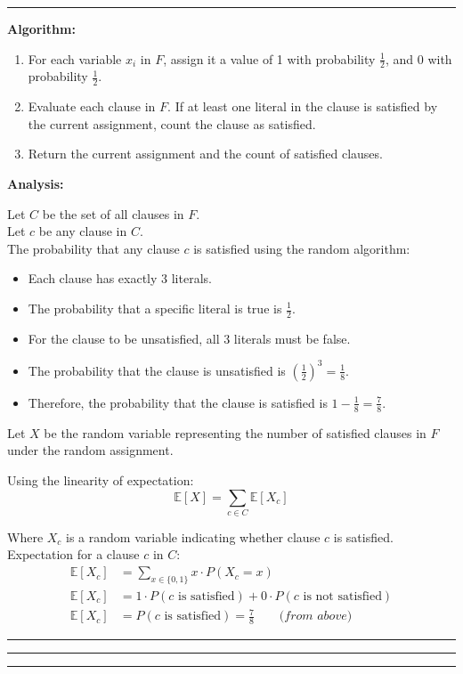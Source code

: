 \documentclass[11pt, english]{article}
\newenvironment{answer}{%
  \par\noindent\hrule %
  \vspace{0.25\baselineskip}%
  \noindent{\Large\bfseries Answer}\par\vspace{0.25\baselineskip}\noindent\ignorespaces
}{%
  \par\vspace{0.5\baselineskip}%
  \noindent\hrule\vspace{0.5\baselineskip}%
  \hrule\hrule
}
\begin{document}
\begin{answer}
\textbf{Algorithm:}
  \begin{enumerate}
    \item  For each variable $x_i$ in $F$, assign it a value of 1 with probability $\frac{1}{2}$, and 0 with probability $\frac{1}{2}$.
    \item Evaluate each clause in $F$. If at least one literal in the clause is satisfied by the current assignment, count the clause as satisfied.
    \item Return the current assignment and the count of satisfied clauses.
  \end{enumerate}

\noindent\textbf{Analysis:}

\noindent Let $C$ be the set of all clauses in $F$.\\
\noindent Let $c$ be any clause in $C$. \\
\noindent The probability that any clause $c$ is satisfied using the random algorithm:
\begin{itemize}
\item Each clause has exactly 3 literals.
\item The probability that a specific literal is true is $\frac{1}{2}$.
\item For the clause to be unsatisfied, all 3 literals must be false.
\item The probability that the clause is unsatisfied is $\left(\frac{1}{2}\right)^3 = \frac{1}{8}$.
\item Therefore, the probability that the clause is satisfied is $1 - \frac{1}{8} = \frac{7}{8}$.
\end{itemize}

\noindent Let $X$ be the random variable representing the number of satisfied 
clauses in $F$ under the random assignment.

\noindent Using the linearity of expectation:
\[
\mathbb{E}[X] = \sum_{c \in C} \mathbb{E}[X_{c}]
\]

\noindent Where $X_{c}$ is a random variable indicating whether clause $c$ is satisfied.\\
\noindent Expectation for a clause $c$ in $C$:
\begin{align*}
\mathbb{E}[X_{c}] &= \sum_{x \in \{0,1\}} x \cdot P(X_{c} = x) \\
\mathbb{E}[X_{c}] &= 1 \cdot P(c \text{ is satisfied}) + 0 \cdot P(c \text{ is not satisfied}) \\
\mathbb{E}[X_{c}] &= P(c \text{ is satisfied}) = \frac{7}{8} \qquad \textit{(from above)}
\end{align*}


\end{answer}
\end{document}
